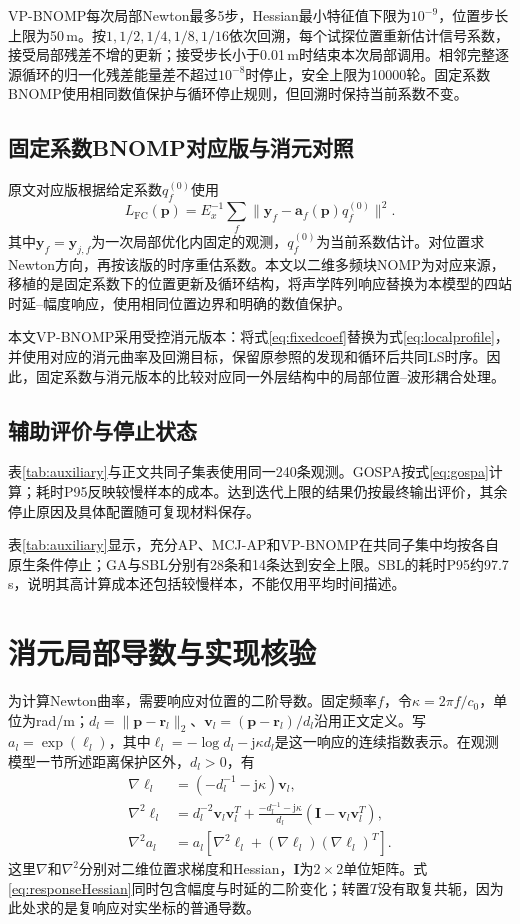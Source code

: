 VP-BNOMP每次局部Newton最多5步，Hessian最小特征值下限为$10^{-9}$，位置步长上限为50\,m。按$1,1/2,1/4,1/8,1/16$依次回溯，每个试探位置重新估计信号系数，接受局部残差不增的更新；接受步长小于0.01\,m时结束本次局部调用。相邻完整逐源循环的归一化残差能量差不超过$10^{-8}$时停止，安全上限为10000轮。固定系数BNOMP使用相同数值保护与循环停止规则，但回溯时保持当前系数不变。

\subsection{固定系数BNOMP对应版与消元对照}
原文对应版根据给定系数$q_f^{(0)}$使用
\begin{equation}
 L_{\mathrm{FC}}(\bm p)=E_x^{-1}\sum_f
 \|\bm y_f-\bm a_f(\bm p)q_f^{(0)}\|^2 .\label{eq:fixedcoef}
\end{equation}
其中$\bm y_f=\bm y_{j,f}$为一次局部优化内固定的观测，$q_f^{(0)}$为当前系数估计。对位置求Newton方向，再按该版的时序重估系数。本文以二维多频块NOMP\cite{Yang2022}为对应来源，移植的是固定系数下的位置更新及循环结构，将声学阵列响应替换为本模型的四站时延--幅度响应，使用相同位置边界和明确的数值保护。

本文VP-BNOMP采用受控消元版本：将式\eqref{eq:fixedcoef}替换为式\eqref{eq:localprofile}，并使用对应的消元曲率及回溯目标，保留原参照的发现和循环后共同LS时序。因此，固定系数与消元版本的比较对应同一外层结构中的局部位置--波形耦合处理。

\subsection{辅助评价与停止状态}
表\ref{tab:auxiliary}与正文共同子集表使用同一240条观测。GOSPA按式\eqref{eq:gospa}计算；耗时P95反映较慢样本的成本。达到迭代上限的结果仍按最终输出评价，其余停止原因及具体配置随可复现材料保存。

表\ref{tab:auxiliary}显示，充分AP、MCJ-AP和VP-BNOMP在共同子集中均按各自原生条件停止；GA与SBL分别有28条和14条达到安全上限。SBL的耗时P95约97.7\,s，说明其高计算成本还包括较慢样本，不能仅用平均时间描述。

\section{消元局部导数与实现核验}\label{app:derivatives}
为计算Newton曲率，需要响应对位置的二阶导数。固定频率$f$，令$\kappa=2\pi f/c_0$，单位为rad/m；$d_l=\|\bm p-\bm r_l\|_2$、$\bm v_l=(\bm p-\bm r_l)/d_l$沿用正文定义。写$a_l=\exp(\ell_l)$，其中$\ell_l=-\log d_l-\mathrm j\kappa d_l$是这一响应的连续指数表示。在观测模型一节所述距离保护区外，$d_l>0$，有
\begin{align}
 \nabla\ell_l&=(-d_l^{-1}-\mathrm j\kappa)\bm v_l,\\
 \nabla^2\ell_l&=d_l^{-2}\bm v_l\bm v_l^T
 +\frac{-d_l^{-1}-\mathrm j\kappa}{d_l}
 (\bm I-\bm v_l\bm v_l^T),\\
 \nabla^2 a_l&=a_l[\nabla^2\ell_l+(\nabla\ell_l)(\nabla\ell_l)^T].\label{eq:responseHessian}
\end{align}
这里$\nabla$和$\nabla^2$分别对二维位置求梯度和Hessian，$\bm I$为$2\times2$单位矩阵。式\eqref{eq:responseHessian}同时包含幅度与时延的二阶变化；转置$T$没有取复共轭，因为此处求的是复响应对实坐标的普通导数。

